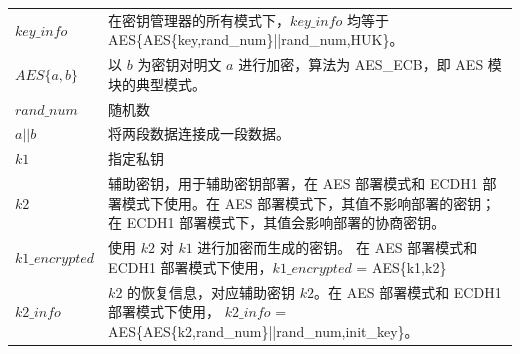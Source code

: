 \documentclass[main\_\_CN.tex]{subfiles}
\begin{document}
\begin{longtable}[c]{ R{6cm} p{10cm} }
\begin{math}key\_info\end{math}\label{para:keyinfo} & 在密钥管理器的所有模式下，\begin{math}key\_info\end{math} 均等于 AES\{AES\{key,rand\_num\}||rand\_num,HUK\}。\\
\begin{math}AES\{a,b\}\end{math} & 以 \begin{math}b\end{math} 为密钥对明文 \begin{math}a\end{math} 进行加密，算法为 AES\_ECB，即 AES 模块的典型模式。\\
\begin{math}rand\_num\end{math} & 随机数\\
\begin{math}a||b\end{math} & 将两段数据连接成一段数据。\\
\begin{math}k1\end{math}\label{para:k1} & 指定私钥 \\
\begin{math}k2\end{math}\label{para:k2} & 辅助密钥，用于辅助密钥部署，在 AES 部署模式和 ECDH1 部署模式下使用。在 AES 部署模式下，其值不影响部署的密钥；在 ECDH1 部署模式下，其值会影响部署的协商密钥。\\
\begin{math}k1\_encrypted\end{math}\label{para:k1enc} & 使用 \begin{math}k2\end{math} 对 \begin{math}k1\end{math} 进行加密而生成的密钥。 在 AES 部署模式和 ECDH1 部署模式下使用，\begin{math}k1\_encrypted\end{math} = AES\{k1,k2\}\\
\begin{math}k2\_info\end{math}\label{para:k2info} & \begin{math}k2\end{math} 的恢复信息，对应辅助密钥 \begin{math}k2\end{math}。在 AES 部署模式和 ECDH1 部署模式下使用， \begin{math}k2\_info\end{math} = AES\{AES\{k2,rand\_num\}||rand\_num,init\_key\}。\\

\end{longtable}
\end{document}
